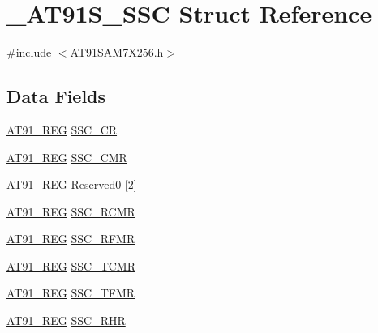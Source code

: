 \hypertarget{struct__AT91S__SSC}{\section{\-\_\-\-A\-T91\-S\-\_\-\-S\-S\-C Struct Reference}
\label{struct__AT91S__SSC}
}


{\ttfamily \#include $<$A\-T91\-S\-A\-M7\-X256.\-h$>$}

\subsection*{Data Fields}
\begin{DoxyCompactItemize}
\item 
\hyperlink{GCC_2ARM7__AT91SAM7S_2AT91SAM7X256_8h_a712ad5a1ac1bd02f3e95a7526c283ce1}{A\-T91\-\_\-\-R\-E\-G} \hyperlink{struct__AT91S__SSC_abfb70171b2d8f15f25b4b9887caea0a0}{S\-S\-C\-\_\-\-C\-R}
\item 
\hyperlink{GCC_2ARM7__AT91SAM7S_2AT91SAM7X256_8h_a712ad5a1ac1bd02f3e95a7526c283ce1}{A\-T91\-\_\-\-R\-E\-G} \hyperlink{struct__AT91S__SSC_a084f2cf43aa620b87b685b910eee8929}{S\-S\-C\-\_\-\-C\-M\-R}
\item 
\hyperlink{GCC_2ARM7__AT91SAM7S_2AT91SAM7X256_8h_a712ad5a1ac1bd02f3e95a7526c283ce1}{A\-T91\-\_\-\-R\-E\-G} \hyperlink{struct__AT91S__SSC_a693b96e74d50346a96aae2d31cbf1169}{Reserved0} \mbox{[}2\mbox{]}
\item 
\hyperlink{GCC_2ARM7__AT91SAM7S_2AT91SAM7X256_8h_a712ad5a1ac1bd02f3e95a7526c283ce1}{A\-T91\-\_\-\-R\-E\-G} \hyperlink{struct__AT91S__SSC_a0262163f3902b4e068d4137a90c1b878}{S\-S\-C\-\_\-\-R\-C\-M\-R}
\item 
\hyperlink{GCC_2ARM7__AT91SAM7S_2AT91SAM7X256_8h_a712ad5a1ac1bd02f3e95a7526c283ce1}{A\-T91\-\_\-\-R\-E\-G} \hyperlink{struct__AT91S__SSC_a3bc511afac6093bd26666794525358f5}{S\-S\-C\-\_\-\-R\-F\-M\-R}
\item 
\hyperlink{GCC_2ARM7__AT91SAM7S_2AT91SAM7X256_8h_a712ad5a1ac1bd02f3e95a7526c283ce1}{A\-T91\-\_\-\-R\-E\-G} \hyperlink{struct__AT91S__SSC_a8608ee56b7f18cd5bb79a8d9602160e9}{S\-S\-C\-\_\-\-T\-C\-M\-R}
\item 
\hyperlink{GCC_2ARM7__AT91SAM7S_2AT91SAM7X256_8h_a712ad5a1ac1bd02f3e95a7526c283ce1}{A\-T91\-\_\-\-R\-E\-G} \hyperlink{struct__AT91S__SSC_a4852182cb23d8db3fbf8fa7d383e18b9}{S\-S\-C\-\_\-\-T\-F\-M\-R}
\item 
\hyperlink{GCC_2ARM7__AT91SAM7S_2AT91SAM7X256_8h_a712ad5a1ac1bd02f3e95a7526c283ce1}{A\-T91\-\_\-\-R\-E\-G} \hyperlink{struct__AT91S__SSC_abe176fa97e45c5f35c56e54e0da6940e}{S\-S\-C\-\_\-\-R\-H\-R}

\end{DoxyCompactItemize}
